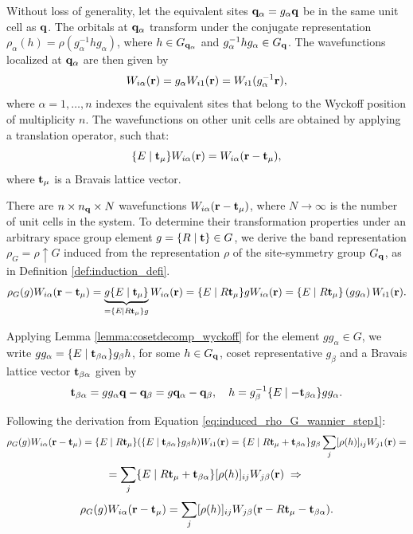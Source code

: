 \documentclass[12pt]{report}
\begin{document}
Without loss of generality, let the equivalent sites \({\vb{q}}_\alpha = g_{\alpha} {\vb{q}}\) be in the same unit cell as \({\vb{q}}\). The orbitals at \({\vb{q}}_\alpha\) transform under the conjugate representation \(\rho_\alpha(h) = \rho(g_\alpha^{-1} h g_\alpha)\), where \(h \in G_{{\vb{q}}_\alpha}\) and \(g_\alpha^{-1} h g_\alpha \in G_{\vb{q}}\). The wavefunctions localized at \({\vb{q}}_\alpha\) are then given by
\begin{equation} \label{eq:Wialpha_galpha_action}
W_{i\alpha}({\vb{r}}) = g_\alpha W_{i1}({\vb{r}}) = W_{i1}(g_\alpha^{-1} {\vb{r}}),
\end{equation}
where \(\alpha = 1, \ldots, n\) indexes the equivalent sites that belong to the Wyckoff position of multiplicity \(n\). The wavefunctions on other unit cells are obtained by applying a translation operator, such that:
\begin{equation} \label{eq:translated_Wialpha}
\{ E \mid {\vb{t}}_\mu \} W_{i\alpha}({\vb{r}}) = W_{i\alpha}({\vb{r}}-{\vb{t}}_\mu),
\end{equation}
where ${\vb{t}}_\mu$ is a Bravais lattice vector.

There are \(n \times n_{\vb{q}} \times N\) wavefunctions \(W_{i\alpha}({\vb{r}} - {\vb{t}}_\mu)\), where \(N \to \infty\) is the number of unit cells in the system. To determine their transformation properties under an arbitrary space group element \(g = \{ R \mid {\vb{t}} \} \in G\), we derive the band representation \(\rho_G = \rho \uparrow G\) induced from the representation \(\rho\) of the site-symmetry group \(G_{\vb{q}}\), as in Definition \ref{def:induction_defi}.
\begin{equation} \label{eq:induced_rho_G_wannier_step1}
\rho_G(g) W_{i\alpha}({\vb{r}}-{\vb{t}}_\mu) =
\underbrace{g \{ E \mid {\vb{t}}_\mu \}}_{= \{ E \mid R{\vb{t}}_\mu \} g} W_{i\alpha} ({\vb{r}}) =
\{ E \mid R{\vb{t}}_\mu \} g W_{i\alpha} ({\vb{r}}) =
\{ E \mid R{\vb{t}}_\mu \} \, (g g_\alpha) \, W_{i1} ({\vb{r}}).
\end{equation}

Applying Lemma \ref{lemma:cosetdecomp_wyckoff} for the element $g g_\alpha \in G$, we write $g g_\alpha = \{ E \mid {\vb{t}}_{\beta\alpha} \} g_\beta h$, for some $h \in G_{\vb{q}}$, coset representative $g_\beta$ and a Bravais lattice vector ${\vb{t}}_{\beta\alpha}$ given by
\begin{equation} \label{eq:t_betaalpha}
{\vb{t}}_{\beta\alpha} = gg_\alpha {\vb{q}} - {\vb{q}}_\beta = g {\vb{q}}_\alpha - {\vb{q}}_\beta, \quad
h = g_\beta^{-1} \{E\mid -{\vb{t}}_{\beta\alpha}\} g g_\alpha.
\end{equation}

Following the derivation from Equation \ref{eq:induced_rho_G_wannier_step1}:
$$
\rho_G(g) W_{i\alpha}({\vb{r}}-{\vb{t}}_\mu) =
\{ E \mid R{\vb{t}}_\mu \} \qty(\{ E \mid {\vb{t}}_{\beta\alpha} \} g_\beta h) W_{i1}({\vb{r}}) =
\{ E \mid R{\vb{t}}_\mu + {\vb{t}}_{\beta\alpha} \} g_\beta \sum_{j} [\rho(h)]_{ij} W_{j1}({\vb{r}}) =
$$
$$
= \sum_{j} \{ E \mid R{\vb{t}}_\mu + {\vb{t}}_{\beta\alpha} \} [\rho(h)]_{ij} W_{j\beta}({\vb{r}}) \; \Rightarrow \;
$$
\begin{equation} \label{eq:wannier_rep}
\rho_G(g) W_{i\alpha}({\vb{r}}-{\vb{t}}_\mu) = \sum_{j} [\rho(h)]_{ij} W_{j\beta}({\vb{r}} - R{\vb{t}}_\mu - {\vb{t}}_{\beta\alpha}).
\end{equation}
\end{document}
